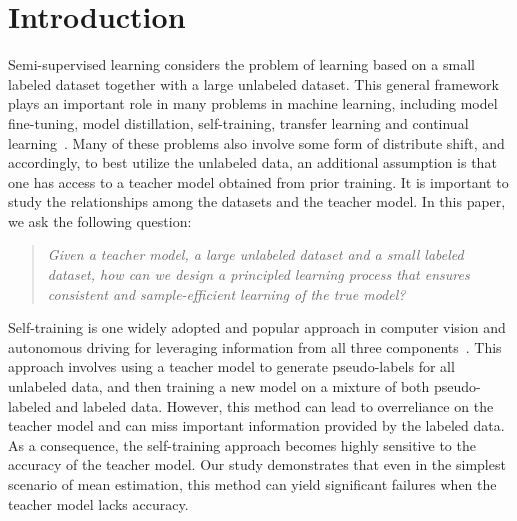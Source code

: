 \section{Introduction}

Semi-supervised learning considers the problem of learning based on a small labeled dataset together with a large unlabeled dataset. This general framework plays an important role in many problems in machine learning, including model fine-tuning, model distillation, self-training, transfer learning and continual learning~\citep{zhu2005semi,pan2010survey, weiss2016survey, gou2021knowledge, de2021continual}. Many of these problems also involve some form of distribute shift, and accordingly, to best utilize the unlabeled data, an additional assumption is that one has access to a teacher model obtained from prior training.  It is important to study the relationships among the datasets and the teacher model.  In this paper, we ask the following question:
\begin{quote}
    \emph{Given a teacher model, a large unlabeled dataset and a small labeled dataset, how can we design a principled learning process that ensures consistent and sample-efficient learning of the true model?}
\end{quote}

Self-training is one widely adopted and popular approach in computer vision and autonomous driving for leveraging information from all three components~\citep{pseudolabel2013,berthelot2019mixmatch,berthelot2019remixmatch,sohn2020fixmatch, xie2020self, jiang2022improving, qi2021offboard}. This approach involves using a teacher model to generate pseudo-labels for all unlabeled data, and then training a new model on a mixture of both pseudo-labeled and labeled data. However, this method can lead to overreliance on the teacher model and can miss important information provided by the labeled data. As a consequence, the self-training approach becomes highly sensitive to the accuracy of the teacher model. Our study demonstrates that even in the simplest scenario of mean estimation, this method can yield significant failures when the teacher model lacks accuracy.



 

